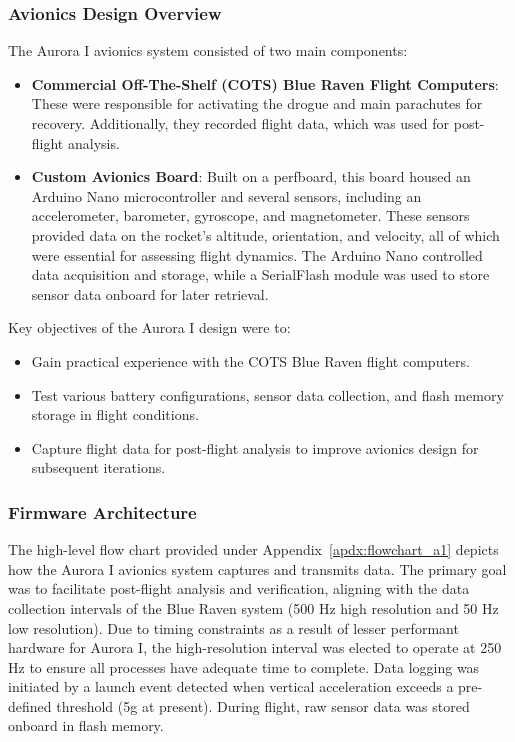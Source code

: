 \subsubsection{Avionics Design Overview}
The Aurora I avionics system consisted of two main components:

\begin{itemize}
    \item \textbf{Commercial Off-The-Shelf (COTS) Blue Raven Flight Computers}: These were responsible for activating the drogue and main parachutes for recovery. Additionally, they recorded flight data, which was used for post-flight analysis.
    \item \textbf{Custom Avionics Board}: Built on a perfboard, this board housed an Arduino Nano microcontroller and several sensors, including an accelerometer, barometer, gyroscope, and magnetometer. These sensors provided data on the rocket's altitude, orientation, and velocity, all of which were essential for assessing flight dynamics. The Arduino Nano controlled data acquisition and storage, while a SerialFlash module was used to store sensor data onboard for later retrieval.
\end{itemize}

Key objectives of the Aurora I design were to:

\begin{itemize}
    \item Gain practical experience with the COTS Blue Raven flight computers.
    \item Test various battery configurations, sensor data collection, and flash memory storage in flight conditions.
    \item Capture flight data for post-flight analysis to improve avionics design for subsequent iterations.
\end{itemize}

\subsubsection{Firmware Architecture}
The high-level flow chart provided under Appendix~\ref{apdx:flowchart_a1} depicts how the Aurora I avionics system captures and transmits data. The primary goal was to facilitate post-flight analysis and verification, aligning with the data collection intervals of the Blue Raven system (500 Hz high resolution and 50 Hz low resolution). Due to timing constraints as a result of lesser performant hardware for Aurora I, the high-resolution interval was elected to operate at 250 Hz to ensure all processes have adequate time to complete. Data logging was initiated by a launch event detected when vertical acceleration exceeds a pre-defined threshold (5g at present). During flight, raw sensor data was stored onboard in flash memory. 

